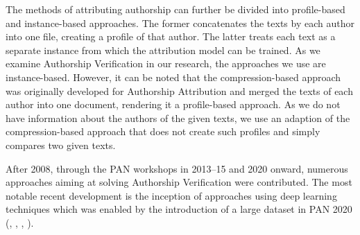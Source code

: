 The methods of attributing authorship can further be divided into profile-based and instance-based approaches.
The former concatenates the texts by each author into one file, creating a profile of that author.
The latter treats each text as a separate instance from which the attribution model can be trained.
As we examine Authorship Verification in our research, the approaches we use are instance-based.
However, it can be noted that the compression-based approach was originally developed for Authorship Attribution and merged the texts of each author into one document, rendering it a profile-based approach.
As we do not have information about the authors of the given texts, we use an adaption of the compression-based approach that does not create such profiles and simply compares two given texts.

After 2008, through the PAN workshops in 2013--15 and 2020 onward, numerous approaches aiming at solving Authorship Verification were contributed.
The most notable recent development is the inception of approaches using deep learning techniques which was enabled by the introduction of a large dataset in PAN 2020 (\cite{boenninghoff2020deep}, \cite{weerasinghe2020feature}, \cite{araujo2020siamese}, \cite{ordonez2020will}).\newline


